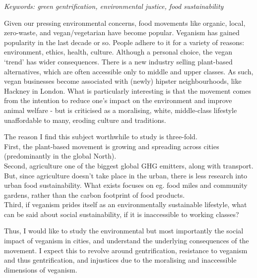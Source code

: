 \documentclass{article}
\begin{document}
\textit{Keywords: green gentrification, environmental justice, food sustainability}

Given our pressing environmental concerns, food movements like organic, local, zero-waste, and vegan/vegetarian have become popular. Veganism has gained popularity in the last decade or so. People adhere to it for a variety of reasons: environment, ethics, health, culture.
Although a personal choice, the vegan `trend' has wider consequences. There is a new industry selling plant-based alternatives, which are often accessible only to middle and upper classes. As such, vegan businesses become associated with (newly) hipster neighbourhoods, like Hackney in London. What is particularly interesting is that the movement comes from the intention to reduce one's impact on the environment and improve animal welfare - but is criticised as a moralising, white, middle-class lifestyle unaffordable to many, eroding culture and traditions.

The reason I find this subject worthwhile to study is three-fold.
\\First, the plant-based movement is growing and spreading across cities (predominantly in the global North). 
\\Second, agriculture one of the biggest global GHG emitters, along with transport. But, since agriculture doesn't take place in the urban, there is less research into urban food sustainability. What exists focuses on eg. food miles and community gardens, rather than the carbon footprint of food products.
\\Third, if veganism prides itself as an environmentally sustainable lifestyle, what can be said about social sustainability, if it is inaccessible to working classes?

Thus, I would like to study the environmental but most importantly the social impact of veganism in cities, and understand the underlying consequences of the movement. I expect this to revolve around gentrification, resistance to veganism and thus gentrification, and  injustices due to the moralising and inaccessible dimensions of veganism.


\end{document}
